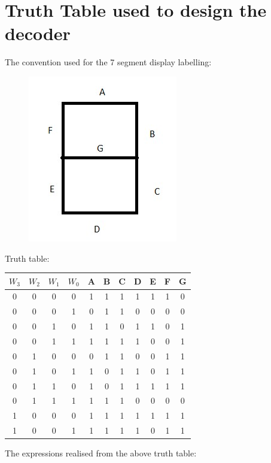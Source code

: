 \documentclass[12pt]{article}
\begin{document}
\section*{Truth Table used to design the decoder}
The convention used for the 7 segment display labelling:
\begin{center}
    \begin{figure}[ht]
        \includegraphics{convention.jpg}

    \end{figure}
\end{center}
Truth table:
\begin{center}
    \begin{tabular}{| c | c | c | c || c | c | c | c | c | c | c  |}
        \hline
        $W_3$ & $W_2$ & $W_1$ & $W_0$ & A & B & C & D & E & F & G \\
        \hline
        0     & 0     & 0     & 0     & 1 & 1 & 1 & 1 & 1 & 1 & 0 \\
        \hline
        0     & 0     & 0     & 1     & 0 & 1 & 1 & 0 & 0 & 0 & 0 \\
        \hline
        0     & 0     & 1     & 0     & 1 & 1 & 0 & 1 & 1 & 0 & 1 \\
        \hline
        0     & 0     & 1     & 1     & 1 & 1 & 1 & 1 & 0 & 0 & 1 \\
        \hline
        0     & 1     & 0     & 0     & 0 & 1 & 1 & 0 & 0 & 1 & 1 \\
        \hline
        0     & 1     & 0     & 1     & 1 & 0 & 1 & 1 & 0 & 1 & 1 \\
        \hline
        0     & 1     & 1     & 0     & 1 & 0 & 1 & 1 & 1 & 1 & 1 \\
        \hline
        0     & 1     & 1     & 1     & 1 & 1 & 1 & 0 & 0 & 0 & 0 \\
        \hline
        1     & 0     & 0     & 0     & 1 & 1 & 1 & 1 & 1 & 1 & 1 \\
        \hline
        1     & 0     & 0     & 1     & 1 & 1 & 1 & 1 & 0 & 1 & 1 \\
        \hline
    \end{tabular}
\end{center}
\newpage
The expressions realised from the above truth table:
\end{document}
